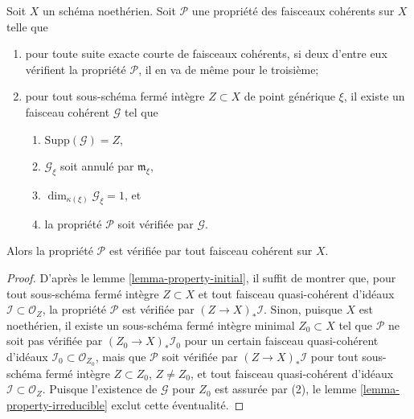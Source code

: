 \begin{lemma}
\label{lemma-property}
Soit $X$ un schéma noethérien.
Soit $\mathcal{P}$ une propriété des faisceaux cohérents sur $X$ telle que
\begin{enumerate}
\item pour toute suite exacte courte de faisceaux cohérents, si
deux d'entre eux vérifient la propriété $\mathcal{P}$, il en va de même pour
le troisième;
\item pour tout sous-schéma fermé intègre $Z \subset X$
de point générique $\xi$, il
existe un faisceau cohérent $\mathcal{G}$ tel que
\begin{enumerate}
\item $\text{Supp}(\mathcal{G}) = Z$,
\item $\mathcal{G}_\xi$ soit annulé par $\mathfrak m_\xi$,
\item $\dim_{\kappa(\xi)} \mathcal{G}_\xi = 1$, et
\item la propriété $\mathcal{P}$ soit vérifiée par $\mathcal{G}$.
\end{enumerate}
\end{enumerate}
Alors la propriété $\mathcal{P}$ est vérifiée par tout faisceau cohérent
sur $X$.
\end{lemma}

\begin{proof}
D'après le lemme \ref{lemma-property-initial}, il suffit de montrer que,
pour tout sous-schéma fermé intègre $Z \subset X$ et tout faisceau
quasi-cohérent d'idéaux $\mathcal{I} \subset \mathcal{O}_Z$, la propriété $\mathcal{P}$
est vérifiée par $(Z \to X)_*\mathcal{I}$. Sinon, puisque $X$ est noethérien,
il existe un sous-schéma fermé intègre minimal $Z_0 \subset X$ tel que
$\mathcal{P}$ ne soit pas vérifiée par $(Z_0 \to X)_*\mathcal{I}_0$ pour un
certain faisceau quasi-cohérent d'idéaux $\mathcal{I}_0 \subset \mathcal{O}_{Z_0}$, mais
que $\mathcal{P}$ soit vérifiée par $(Z \to X)_*\mathcal{I}$ pour tout sous-schéma
fermé intègre $Z \subset Z_0$, $Z \not = Z_0$, et tout
faisceau quasi-cohérent d'idéaux $\mathcal{I} \subset \mathcal{O}_Z$. Puisque l'existence
de $\mathcal{G}$ pour $Z_0$ est assurée par (2), le
lemme \ref{lemma-property-irreducible} exclut cette éventualité.
\end{proof}

